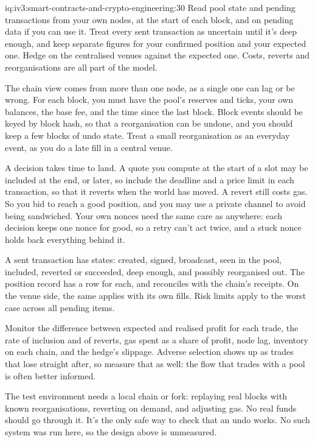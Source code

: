 \begin{solution}{iq:iv3:smart-contracts-and-crypto-engineering:30}
Read pool state and pending transactions from your own nodes, at the start of each block, and on pending data if you can use it. Treat every sent transaction as uncertain until it's deep enough, and keep separate figures for your confirmed position and your expected one. Hedge on the centralised venues against the expected one. Costs, reverts and reorganisations are all part of the model.

The chain view comes from more than one node, as a single one can lag or be wrong. For each block, you must have the pool's reserves and ticks, your own balances, the base fee, and the time since the last block. Block events should be keyed by block hash, so that a reorganisation can be undone, and you should keep a few blocks of undo state. Treat a small reorganisation as an everyday event, as you do a late fill in a central venue.

A decision takes time to land. A quote you compute at the start of a slot may be included at the end, or later, so include the deadline and a price limit in each transaction, so that it reverts when the world has moved. A revert still costs gas. So you bid to reach a good position, and you may use a private channel to avoid being sandwiched. Your own nonces need the same care as anywhere: each decision keeps one nonce for good, so a retry can't act twice, and a stuck nonce holds back everything behind it.

A sent transaction has states: created, signed, broadcast, seen in the pool, included, reverted or succeeded, deep enough, and possibly reorganised out. The position record has a row for each, and reconciles with the chain's receipts. On the venue side, the same applies with its own fills. Risk limits apply to the worst case across all pending items.

Monitor the difference between expected and realised profit for each trade, the rate of inclusion and of reverts, gas spent as a share of profit, node lag, inventory on each chain, and the hedge's slippage. Adverse selection shows up as trades that lose straight after, so measure that as well: the flow that trades with a pool is often better informed.

The test environment needs a local chain or fork: replaying real blocks with known reorganisations, reverting on demand, and adjusting gas. No real funds should go through it. It's the only safe way to check that an undo works. No such system was run here, so the design above is unmeasured.

\end{solution}
